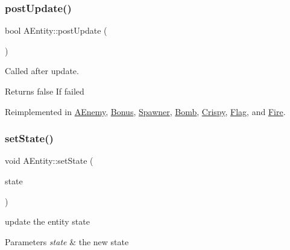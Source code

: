 \subsubsection{\texorpdfstring{post\+Update()}{postUpdate()}}
{\footnotesize\ttfamily bool A\+Entity\+::post\+Update (\begin{DoxyParamCaption}{ }\end{DoxyParamCaption})\hspace{0.3cm}{\ttfamily [virtual]}}



Called after update. 

\begin{DoxyReturn}{Returns}
false If failed 
\end{DoxyReturn}


Reimplemented in \hyperlink{class_a_enemy_a2d2ff5a126f14294bdbc17475c363d00}{A\+Enemy}, \hyperlink{class_bonus_a6524cf732f98dfc3baa7f41bbdf13b11}{Bonus}, \hyperlink{class_spawner_ab8a55710ca6e122d975f697a9c7643bc}{Spawner}, \hyperlink{class_bomb_a443c5d40a92e67ef456c71369e8a111b}{Bomb}, \hyperlink{class_crispy_aa83ad22c80b962ee0380c1e394ae8610}{Crispy}, \hyperlink{class_flag_a1840a0949762e3e62bf156be6e173d1e}{Flag}, and \hyperlink{class_fire_adba3c7ec49ed7d31fd35250105a35edf}{Fire}.

\mbox{\label{class_a_entity_ae68a6ff3f5770215116b6ab99d098ed0}} 
\subsubsection{\texorpdfstring{set\+State()}{setState()}}
{\footnotesize\ttfamily void A\+Entity\+::set\+State (\begin{DoxyParamCaption}\item[{Entity\+State\+::\+Enum}]{state }\end{DoxyParamCaption})}



update the entity state 


\begin{DoxyParams}{Parameters}
{\em state} & the new state \\
\hline
\end{DoxyParams}
\mbox{\label{class_a_entity_ac01e24195a8ba249c855120ac017770e}} 
